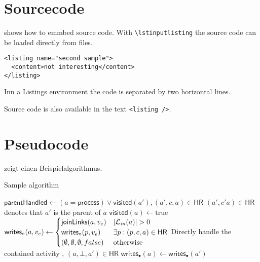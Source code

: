 \section{Sourcecode}
 shows how to emmbed source code.
With \texttt{\textbackslash lstinputlisting} the source code can be loaded directly from files.

\begin{Listing}
  \begin{lstlisting}
<listing name="second sample">
  <content>not interesting</content>
</listing>
\end{lstlisting}
  \caption{Inn a Listings environment the code is separated by two horizontal lines.}
  \label{lst:ListingANDlstlisting}
\end{Listing}

Source code is also available in the text \lstinline|<listing />|.


\section{Pseudocode}
 zeigt einen Beispielalgorithmus.
\begin{Algorithmus} %
  \caption{Sample algorithm}
  \label{alg:sample}
  \begin{algorithmic}
\State $\mathsf{parentHandled} \gets (a = \mathsf{process}) \lor \mathsf{visited}(a'), (a',c,a) \in \mathsf{HR}$
\State \Comment $(a',c'a) \in \mathsf{HR}$ denotes that $a'$ is the parent of $a$
\State $\mathsf{visited}(a) \gets \text{true}$
\State $\mathsf{writes}_\circ(a,v_e) \gets
\begin{cases}
\mathsf{joinLinks}(a,v_e) & \left\lvert\mathcal{L}_\mathit{in}(a)\right\rvert > 0\\
\mathsf{writes}_\circ(p,v_e)
& \exists p: (p,c,a) \in \mathsf{HR}\\
(\emptyset, \emptyset, \emptyset, false) & \text{otherwise}
\end{cases}
$
  \State {}
  \State {}
 \Comment Directly handle the contained activity
  \State {}, $(a,\bot,a') \in \mathsf{HR}$
  \State $\mathsf{writes}_\bullet(a) \gets \mathsf{writes}_\bullet(a')$
\EndIf
{}
  \State {}
\EndFor
\EndIf
\EndProcedure
  \end{algorithmic}
\end{Algorithmus}

